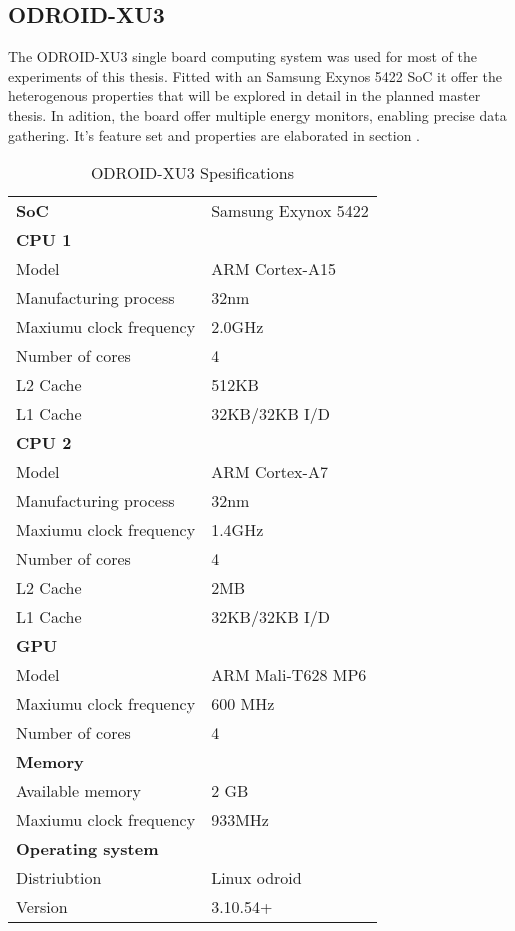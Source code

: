 \subsection{ODROID-XU3}
The ODROID-XU3 single board computing system was used for most of the experiments of this thesis.
Fitted with an Samsung Exynos 5422 SoC it offer the heterogenous properties that will be explored in detail in the planned master thesis.
In adition, the board offer multiple energy monitors, enabling precise data gathering.
It's feature set and properties are elaborated in section .

\begin{table}[h]
  \begin{tabular}{ll}
    \textbf{SoC}              & Samsung Exynox 5422 \\
    \textbf{CPU 1}            &  \\
    Model                     & ARM Cortex-A15 \\
    Manufacturing process     & 32nm \\
    Maxiumu clock frequency   & 2.0GHz \\
    Number of cores           & 4 \\
    L2 Cache                  & 512KB \\
    L1 Cache                  & 32KB/32KB I/D \\
    \textbf{CPU 2}            &  \\
    Model                     & ARM Cortex-A7 \\
    Manufacturing process     & 32nm \\
    Maxiumu clock frequency   & 1.4GHz \\
    Number of cores           & 4 \\
    L2 Cache                  & 2MB \\
    L1 Cache                  & 32KB/32KB I/D \\
    \textbf{GPU}              &  \\
    Model                     & ARM Mali-T628 MP6 \\
    Maxiumu clock frequency   & 600 MHz \\
    Number of cores           & 4 \\
    \textbf{Memory}           &  \\
    Available memory          & 2 GB \\
    Maxiumu clock frequency   & 933MHz \\
    \textbf{Operating system} &  \\
    Distriubtion              & Linux odroid \\
    Version                   & 3.10.54+
  \end{tabular}
  \caption{ODROID-XU3 Spesifications\label{overflow}}
\end{table}

